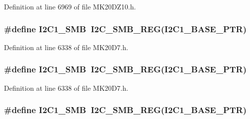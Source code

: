 Definition at line 6969 of file M\+K20\+D\+Z10.\+h.

\subsubsection[{\texorpdfstring{I2\+C1\+\_\+\+S\+MB}{I2C1_SMB}}]{\setlength{\rightskip}{0pt plus 5cm}\#define I2\+C1\+\_\+\+S\+MB~{\bf I2\+C\+\_\+\+S\+M\+B\+\_\+\+R\+EG}({\bf I2\+C1\+\_\+\+B\+A\+S\+E\+\_\+\+P\+TR})}\hypertarget{group___i2_c___register___accessor___macros_gaa9377a6d31b5c6a841b69330a6e8d59d}{}\label{group___i2_c___register___accessor___macros_gaa9377a6d31b5c6a841b69330a6e8d59d}


Definition at line 6338 of file M\+K20\+D7.\+h.

\subsubsection[{\texorpdfstring{I2\+C1\+\_\+\+S\+MB}{I2C1_SMB}}]{\setlength{\rightskip}{0pt plus 5cm}\#define I2\+C1\+\_\+\+S\+MB~{\bf I2\+C\+\_\+\+S\+M\+B\+\_\+\+R\+EG}({\bf I2\+C1\+\_\+\+B\+A\+S\+E\+\_\+\+P\+TR})}\hypertarget{group___i2_c___register___accessor___macros_gaa9377a6d31b5c6a841b69330a6e8d59d}{}\label{group___i2_c___register___accessor___macros_gaa9377a6d31b5c6a841b69330a6e8d59d}


Definition at line 6338 of file M\+K20\+D7.\+h.

\subsubsection[{\texorpdfstring{I2\+C1\+\_\+\+S\+MB}{I2C1_SMB}}]{\setlength{\rightskip}{0pt plus 5cm}\#define I2\+C1\+\_\+\+S\+MB~{\bf I2\+C\+\_\+\+S\+M\+B\+\_\+\+R\+EG}({\bf I2\+C1\+\_\+\+B\+A\+S\+E\+\_\+\+P\+TR})}\hypertarget{group___i2_c___register___accessor___macros_gaa9377a6d31b5c6a841b69330a6e8d59d}{}\label{group___i2_c___register___accessor___macros_gaa9377a6d31b5c6a841b69330a6e8d59d}


